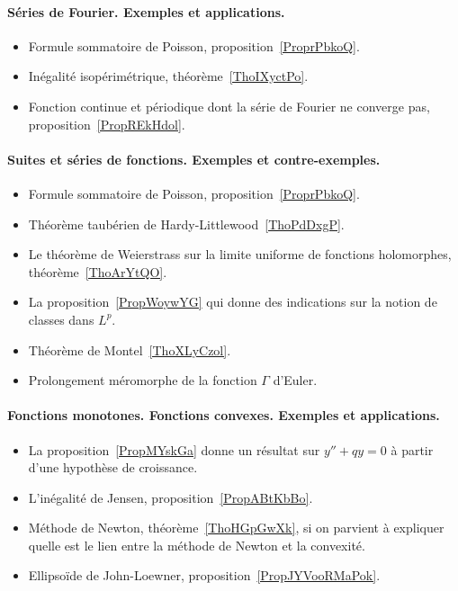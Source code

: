 \paragraph{Séries de Fourier. Exemples et applications.}
\begin{itemize}
    \item Formule sommatoire de Poisson, proposition~\ref{ProprPbkoQ}.
    \item Inégalité isopérimétrique, théorème~\ref{ThoIXyctPo}.
    \item Fonction continue et périodique dont la série de Fourier ne converge pas, proposition~\ref{PropREkHdol}.
\end{itemize}
\paragraph{Suites et séries de fonctions. Exemples et contre-exemples.}
\begin{itemize}
    \item Formule sommatoire de Poisson, proposition~\ref{ProprPbkoQ}.
    \item Théorème taubérien de Hardy-Littlewood~\ref{ThoPdDxgP}.
    \item Le théorème de Weierstrass sur la limite uniforme de fonctions holomorphes, théorème~\ref{ThoArYtQO}.
    \item La proposition~\ref{PropWoywYG} qui donne des indications sur la notion de classes dans \( L^p\).
    \item Théorème de Montel~\ref{ThoXLyCzol}.
    \item Prolongement méromorphe de la fonction \( \Gamma\) d'Euler.
\end{itemize}
\paragraph{Fonctions monotones. Fonctions convexes. Exemples et applications.}
\begin{itemize}
    \item La proposition~\ref{PropMYskGa} donne un résultat sur \( y''+qy=0\) à partir d'une hypothèse de croissance.
    \item L'inégalité de Jensen, proposition~\ref{PropABtKbBo}.
    \item Méthode de Newton, théorème~\ref{ThoHGpGwXk}, si on parvient à expliquer quelle est le lien entre la méthode de Newton et la convexité.
    \item Ellipsoïde de John-Loewner, proposition~\ref{PropJYVooRMaPok}.
\end{itemize}

